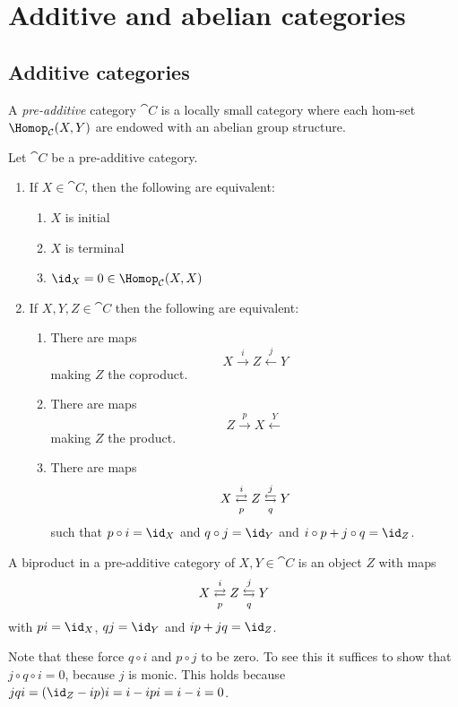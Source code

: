 \documentclass[../main.tex]{subfiles}
\begin{document}
\chapter{Additive and abelian categories}
\section{Additive categories}
\begin{defn}
	A \emph{pre-additive} category $\cat C$ is a locally small category where each hom-set $\Hom_{\cat C}(X, Y)$ are endowed with an abelian group structure.
\end{defn}
\begin{lem}\label{lem:pre-additive-categories-are-nice}
Let $\cat C$ be a pre-additive category.
\begin{enumerate}
	\item If $X \in \cat C$, then the following are equivalent:
	\begin{enumerate}
    	\item $X$ is initial
		\item $X$ is terminal
		\item $\id_X = 0 \in \Hom_{\cat C}(X,X)$
    \end{enumerate}
	\item If $X, Y, Z \in \cat C$ then the following are equivalent:
	\begin{enumerate}
    	\item There are maps \[X \xrightarrow{i} Z \xleftarrow{j} Y\] making $Z$ the coproduct.
    	\item There are maps \[Z \xrightarrow{p} X \xleftarrow Y\] making $Z$ the product.
		\item There are maps \[X \xrightleftarrows{i}[p] Z \xleftrightarrows{j}[q] Y\] such that $p \circ i = \id_X$ and $q \circ j = \id_Y$ and $i\circ p + j \circ q = \id_Z$.
    \end{enumerate}

\end{enumerate}

\end{lem}

\begin{defn}
	A biproduct in a pre-additive category of $X, Y \in \cat C$ is an object $Z$ with maps \[X \xrightleftarrows{i}[p] Z \xleftrightarrows{j}[q] Y\] with $pi = \id_X$, $qj = \id_Y$ and $ip + jq = \id_Z$.
\end{defn}
\begin{rmk}
	Note that these force $q \circ i$ and $p \circ j$ to be zero. To see this it suffices to show that $j \circ q \circ i = 0$, because $j$ is monic.
	This holds because $jqi = (\id_Z - ip)i = i - ipi = i - i = 0$.
\end{rmk}
\end{document}
